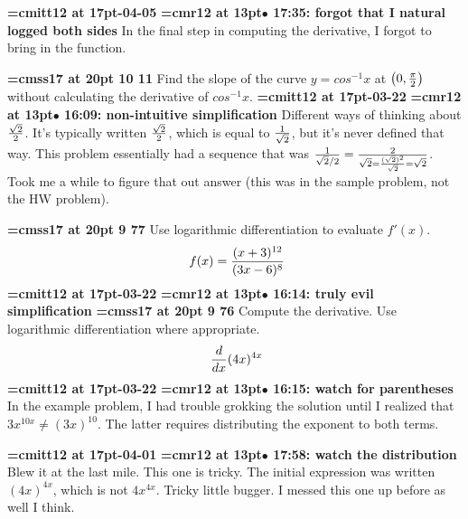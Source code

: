 {\medskip\noindent\bf\font\titlefont=cmitt12 at 17pt-04-05}\medskip
{\smallskip\noindent\bf\font\titlefont=cmr12 at 13pt\titlefont $\bullet$ 17:35: forgot that I natural logged both sides}\smallskip
In the final step in computing the derivative, I forgot to bring in the function.
\par

{\medskip\noindent\bf\font\titlefont=cmss17 at 20pt 10 11}\medskip
Find the slope of the curve $y = cos^{-1} x$ at
$\big(0, {\pi \over 2}\big)$ without calculating the
derivative of $cos^{-1}x$.
{\medskip\noindent\bf\font\titlefont=cmitt12 at 17pt-03-22}\medskip
{\smallskip\noindent\bf\font\titlefont=cmr12 at 13pt\titlefont $\bullet$ 16:09: non-intuitive simplification}\smallskip
Different ways of thinking about $\sqrt{2} \over 2$. It's typically written $\sqrt{2} \over 2$, which is equal to $1 \over \sqrt{2}$, but it's never defined that way. This problem essentially had a sequence that was ${1 \over {\sqrt{2} / 2}} = {2 \over {\sqrt{2}} = {(\sqrt{2})^2 \over \sqrt{2}} = \sqrt{2}}$. Took me a while to figure that out answer (this was in the sample problem, not the HW problem).
\par

{\medskip\noindent\bf\font\titlefont=cmss17 at 20pt 9 77}\medskip
Use logarithmic differentiation to evaluate $f'(x)$.
$$\
f(x) = {
(x + 3)^{12}
\over
(3x - 6)^8
}
$$
{\medskip\noindent\bf\font\titlefont=cmitt12 at 17pt-03-22}\medskip
{\smallskip\noindent\bf\font\titlefont=cmr12 at 13pt\titlefont $\bullet$ 16:14: truly evil simplification}\smallskip
\xrdef{node98}
{\medskip\noindent\bf\font\titlefont=cmss17 at 20pt 9 76}\medskip
Compute the derivative. Use logarithmic differentiation where
appropriate.
$$\
{d \over dx}
(4x)^{4x}
$$
{\medskip\noindent\bf\font\titlefont=cmitt12 at 17pt-03-22}\medskip
{\smallskip\noindent\bf\font\titlefont=cmr12 at 13pt\titlefont $\bullet$ 16:15: watch for parentheses}\smallskip
In the example problem, I had trouble grokking the solution until I realized that $3x^{10x} \ne (3x)^{10}$. The latter requires distributing the exponent to both terms.
\par

{\medskip\noindent\bf\font\titlefont=cmitt12 at 17pt-04-01}\medskip
{\smallskip\noindent\bf\font\titlefont=cmr12 at 13pt\titlefont $\bullet$ 17:58: watch the distribution}\smallskip
Blew it at the last mile. This one is tricky. The initial expression was written $(4x)^{4x}$, which is not $4x^{4x}$. Tricky little bugger. I messed this one up before as well I think.
\par

